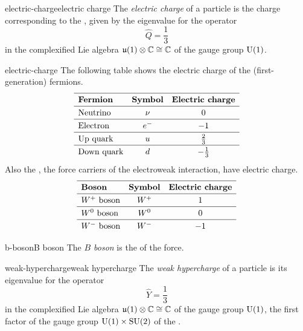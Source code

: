 \begin{topic}{electric-charge}{electric charge}
    The \emph{electric charge} of a particle is the charge corresponding to the , given by the eigenvalue for the operator
    \[ \hat{Q} = \frac{1}{3} \]
    in the complexified Lie algebra $\mathfrak{u}(1) \otimes \mathbb{C} \cong \mathbb{C}$ of the gauge group $\textup{U}(1)$.
\end{topic}

\begin{example}{electric-charge}
    The following table shows the electric charge of the (first-generation) fermions.
    \[ \def\arraystretch{1.25} \begin{array}{lcc}
         \hline \textbf{Fermion} & \textbf{Symbol} & \textbf{Electric charge} \\
         \hline \textup{Neutrino} & \nu & 0 \\
         \hline \textup{Electron} & e^- & -1 \\
         \hline \textup{Up quark} & u & \tfrac{2}{3} \\
         \hline \textup{Down quark} & d & - \tfrac{1}{3}
    \end{array} \]
    Also the , the force carriers of the electroweak interaction, have electric charge.
    \[ \def\arraystretch{1.25} \begin{array}{lcc}
         \hline \textbf{Boson} & \textbf{Symbol} & \textbf{Electric charge} \\
         \hline \textup{$W^+$ boson} & W^+ & 1 \\
         \hline \textup{$W^0$ boson} & W^0 & 0 \\
         \hline \textup{$W^-$ boson} & W^- & -1 \\
    \end{array} \]
\end{example}

\begin{topic}{b-boson}{B boson}
    The \emph{$B$ boson} is the  of the  force.
\end{topic}

\begin{topic}{weak-hypercharge}{weak hypercharge}
    The \emph{weak hypercharge} of a particle is its eigenvalue for the operator
    \[ \hat{Y} = \frac{1}{3} \]
    in the complexified Lie algebra $\mathfrak{u}(1) \otimes \mathbb{C} \cong \mathbb{C}$ of the gauge group $\textup{U}(1)$, the first factor of the gauge group $\textup{U}(1) \times \textup{SU}(2)$ of the .
\end{topic}

